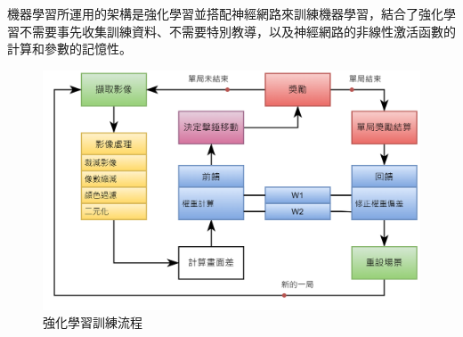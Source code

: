 \documentclass[14pt,a4paper]{report}  %
\begin{document}
 機器學習所運用的架構是強化學習並搭配神經網路來訓練機器學習，結合了強化學習不需要事先收集訓練資料、不需要特別教導，以及神經網路的非線性激活函數的計算和參數的記憶性。\\
\begin{figure}[hbt!]
\begin{center}
\includegraphics[width=15cm]{強化學習訓練流程}
\caption{\Large 強化學習訓練流程}
\label{fig.強化學習程式流程}
\end{center}
\end{figure}
\end{document}
